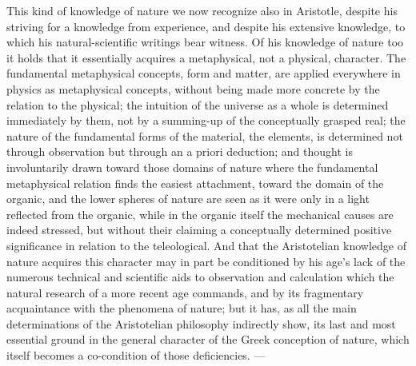 This kind of knowledge of nature we now recognize also in Aristotle,
despite his striving for a knowledge from experience, and despite his
extensive knowledge, to which his natural-scientific writings bear
witness. Of his knowledge of nature too it holds that it essentially
acquires a metaphysical, not a physical, character. The fundamental
metaphysical concepts, form and matter, are applied everywhere in
physics as metaphysical concepts, without being made more concrete by
the relation to the physical; the intuition of the universe as a whole
is determined immediately by them, not by a summing-up of the
conceptually grasped real; the nature of the fundamental forms of the
material, the elements, is determined not through observation but
through an a priori deduction; and thought is involuntarily drawn
toward those domains of nature where the fundamental metaphysical
relation finds the easiest attachment, toward the domain of the
organic, and the lower spheres of nature are seen as it were only in a
light reflected from the organic, while in the organic itself the
mechanical causes are indeed stressed, but without their claiming a
conceptually determined positive significance in relation to the
teleological. And that the Aristotelian knowledge of nature acquires
this character may in part be conditioned by his age's lack of the
numerous technical and scientific aids to observation and calculation
which the natural research of a more recent age commands, and by its
fragmentary acquaintance with the phenomena of nature; but it has, as
all the main determinations of the Aristotelian philosophy indirectly
show, its last and most essential ground in the general
character of the Greek conception of nature, which itself becomes a
co-condition of those deficiencies. ---

